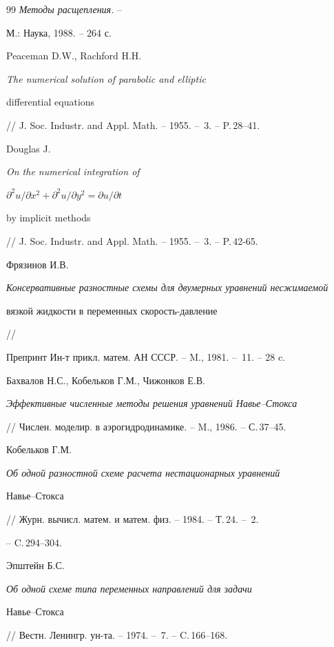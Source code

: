 \begin{thebibliography}{99}
{\it Методы расщепления.} --


М.: Наука, 1988. -- 264 с.




Peaceman D.W., Rachford H.H.


{\it The numerical solution of parabolic and elliptic


differential equations}


// J. Soc. Industr. and Appl. Math. -- 1955. -- \No\,3. -- P.\,28--41.




Douglas J.


{\it On the numerical integration of


$\partial^2u/\partial x^2+\partial^2u/\partial y^2=\partial u/\partial t$


by implicit methods}


// J. Soc. Industr. and Appl. Math. -- 1955. -- \No\,3. -- P.\,42-65.




Фрязинов И.В.


{\it Консервативные разностные схемы для двумерных уравнений несжимаемой


вязкой жидкости в переменных скорость-давление} //


Препринт Ин-т прикл. матем. АН СССР. -- M., 1981. -- \No\,11. -- 28 c.




Бахвалов Н.С., Кобельков Г.М., Чижонков Е.В.


{\it Эффективные численные методы решения уравнений Навье--Стокса}


// Числен. моделир. в аэрогидродинамике. -- M., 1986. -- С.\,37--45.




Кобельков Г.М.


{\it Об одной разностной схеме расчета нестационарных уравнений


Навье--Стокса}


// Журн. вычисл. матем. и матем. физ. -- 1984. -- Т.\,24. -- \No\,2.


-- C.\,294--304.




Эпштейн Б.С.


{\it Об одной схеме типа переменных направлений для задачи


Навье--Стокса}


// Вестн. Ленингр. ун-та. -- 1974. -- \No\,7. -- C.\,166--168.



\end{thebibliography}
